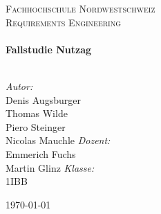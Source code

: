 \begin{titlepage}
\begin{center}
\textsc{\LARGE Fachhochschule Nordwestschweiz}\\[1.5cm]
\textsc{\Large Requirements Engineering}\\[0.5cm]
\HRule \\[0.4cm]
{ \huge \bfseries Fallstudie Nutzag}\\[0.4cm]
\HRule \\[1.5cm]
\begin{minipage}{1.2\textwidth}
\begin{flushleft} \large
\emph{Autor:}\\
Denis Augsburger\\
Thomas Wilde\\
Piero Steinger\\
Nicolas Mauchle
\newline
\newline
\emph{Dozent:} \\
Emmerich Fuchs\\
Martin Glinz
\newline
\newline
\emph{Klasse:} \\
1IBB\\
\end{flushleft}
\end{minipage}
\vfill
{\large \today}
\end{center}
\end{titlepage}
